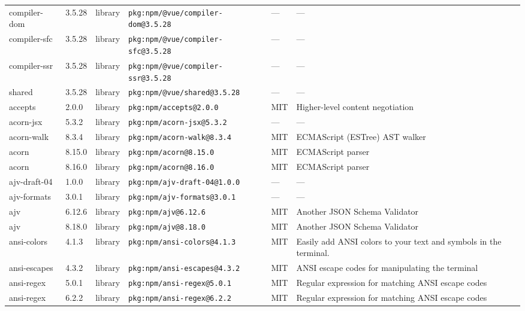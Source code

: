 \documentclass[11pt,a4paper]{article}
\begin{document}
\begin{longtable}{|p{4cm}|p{2cm}|p{1.6cm}|p{5cm}|p{1.5cm}|p{3.5cm}|}
\raggedright compiler-dom & 3.5.28 & library & \small\texttt{pkg:npm/@vue/compiler-dom@3.5.28} & — & \small — \\
\raggedright compiler-sfc & 3.5.28 & library & \small\texttt{pkg:npm/@vue/compiler-sfc@3.5.28} & — & \small — \\
\raggedright compiler-ssr & 3.5.28 & library & \small\texttt{pkg:npm/@vue/compiler-ssr@3.5.28} & — & \small — \\
\raggedright shared & 3.5.28 & library & \small\texttt{pkg:npm/@vue/shared@3.5.28} & — & \small — \\
\raggedright accepts & 2.0.0 & library & \small\texttt{pkg:npm/accepts@2.0.0} & MIT & \small Higher-level content negotiation \\
\raggedright acorn-jsx & 5.3.2 & library & \small\texttt{pkg:npm/acorn-jsx@5.3.2} & — & \small — \\
\raggedright acorn-walk & 8.3.4 & library & \small\texttt{pkg:npm/acorn-walk@8.3.4} & MIT & \small ECMAScript (ESTree) AST walker \\
\raggedright acorn & 8.15.0 & library & \small\texttt{pkg:npm/acorn@8.15.0} & MIT & \small ECMAScript parser \\
\raggedright acorn & 8.16.0 & library & \small\texttt{pkg:npm/acorn@8.16.0} & MIT & \small ECMAScript parser \\
\raggedright ajv-draft-04 & 1.0.0 & library & \small\texttt{pkg:npm/ajv-draft-04@1.0.0} & — & \small — \\
\raggedright ajv-formats & 3.0.1 & library & \small\texttt{pkg:npm/ajv-formats@3.0.1} & — & \small — \\
\raggedright ajv & 6.12.6 & library & \small\texttt{pkg:npm/ajv@6.12.6} & MIT & \small Another JSON Schema Validator \\
\raggedright ajv & 8.18.0 & library & \small\texttt{pkg:npm/ajv@8.18.0} & MIT & \small Another JSON Schema Validator \\
\raggedright ansi-colors & 4.1.3 & library & \small\texttt{pkg:npm/ansi-colors@4.1.3} & MIT & \small Easily add ANSI colors to your text and symbols in the terminal.  \\
\raggedright ansi-escapes & 4.3.2 & library & \small\texttt{pkg:npm/ansi-escapes@4.3.2} & MIT & \small ANSI escape codes for manipulating the terminal \\
\raggedright ansi-regex & 5.0.1 & library & \small\texttt{pkg:npm/ansi-regex@5.0.1} & MIT & \small Regular expression for matching ANSI escape codes \\
\raggedright ansi-regex & 6.2.2 & library & \small\texttt{pkg:npm/ansi-regex@6.2.2} & MIT & \small Regular expression for matching ANSI escape codes \\

\end{longtable}
\end{document}
